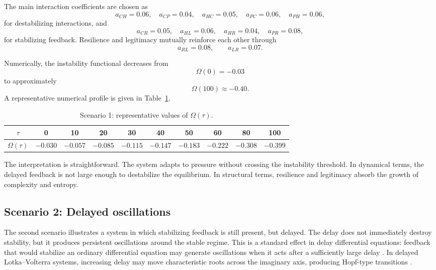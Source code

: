 \documentclass[11pt]{article}
\begin{document}
The main interaction coefficients are chosen as
\[
a_{CH}=0.06,\quad
a_{CP}=0.04,\quad
a_{HC}=0.05,\quad
a_{PC}=0.06,\quad
a_{PH}=0.06,
\]
for destabilizing interactions, and
\[
a_{CR}=0.05,\quad
a_{HL}=0.06,\quad
a_{HR}=0.04,\quad
a_{PR}=0.08,
\]
for stabilizing feedback. Resilience and legitimacy mutually reinforce each other through
\[
a_{RL}=0.08,
\qquad
a_{LR}=0.07.
\]

Numerically, the instability functional decreases from
\[
\Omega(0)=-0.03
\]
to approximately
\[
\Omega(100)\approx -0.40.
\]
A representative numerical profile is given in Table~\ref{tab:omega_stable}.

\begin{table}[h!]
	\centering
	\caption{Scenario 1: representative values of \(\Omega(\tau)\).}
	\label{tab:omega_stable}
	\begin{tabular}{cccccccccc}
		\toprule
		\(\tau\) & 0 & 10 & 20 & 30 & 40 & 50 & 60 & 80 & 100 \\
		\midrule
		\(\Omega(\tau)\) 
		& \(-0.030\) & \(-0.057\) & \(-0.085\) & \(-0.115\) & \(-0.147\) & \(-0.183\) & \(-0.222\) & \(-0.308\) & \(-0.399\) \\
		\bottomrule
	\end{tabular}
\end{table}

The interpretation is straightforward. The system adapts to pressure without crossing the instability threshold. In dynamical terms, the delayed feedback is not large enough to destabilize the equilibrium. In structural terms, resilience and legitimacy absorb the growth of complexity and entropy.

\subsection{Scenario 2: Delayed oscillations}

The second scenario illustrates a system in which stabilizing feedback is still present, but delayed. The delay does not immediately destroy stability, but it produces persistent oscillations around the stable regime. This is a standard effect in delay differential equations: feedback that would stabilize an ordinary differential equation may generate oscillations when it acts after a sufficiently large delay \cite{rihan2021dde}. In delayed Lotka--Volterra systems, increasing delay may move characteristic roots across the imaginary axis, producing Hopf-type transitions \cite{saeedian2022delay,chenjiang2021turinghopf}.
\end{document}
